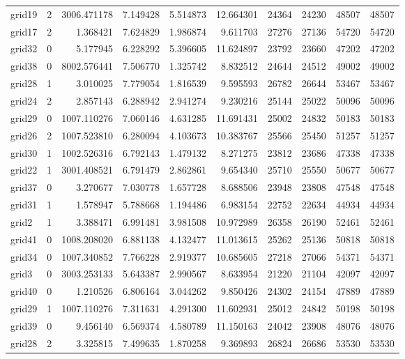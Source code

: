 \begin{longtable}{|l|r|r|r|r|r|r|r|r|r|}
grid19 & 2 & 3006.471178 & 7.149428 & 5.514873 & 12.664301 & 24364 & 24230 & 48507 & 48507 \\
grid17 & 2 & 1.368421 & 7.624829 & 1.986874 & 9.611703 & 27276 & 27136 & 54720 & 54720 \\
grid32 & 0 & 5.177945 & 6.228292 & 5.396605 & 11.624897 & 23792 & 23660 & 47202 & 47202 \\
grid38 & 0 & 8002.576441 & 7.506770 & 1.325742 & 8.832512 & 24644 & 24512 & 49002 & 49002 \\
grid28 & 1 & 3.010025 & 7.779054 & 1.816539 & 9.595593 & 26782 & 26644 & 53467 & 53467 \\
grid24 & 2 & 2.857143 & 6.288942 & 2.941274 & 9.230216 & 25144 & 25022 & 50096 & 50096 \\
grid29 & 0 & 1007.110276 & 7.060146 & 4.631285 & 11.691431 & 25002 & 24832 & 50183 & 50183 \\
grid26 & 2 & 1007.523810 & 6.280094 & 4.103673 & 10.383767 & 25566 & 25450 & 51257 & 51257 \\
grid30 & 1 & 1002.526316 & 6.792143 & 1.479132 & 8.271275 & 23812 & 23686 & 47338 & 47338 \\
grid22 & 1 & 3001.408521 & 6.791479 & 2.862861 & 9.654340 & 25710 & 25550 & 50677 & 50677 \\
grid37 & 0 & 3.270677 & 7.030778 & 1.657728 & 8.688506 & 23948 & 23808 & 47548 & 47548 \\
grid31 & 1 & 1.578947 & 5.788668 & 1.194486 & 6.983154 & 22752 & 22634 & 44934 & 44934 \\
grid2 & 1 & 3.388471 & 6.991481 & 3.981508 & 10.972989 & 26358 & 26190 & 52461 & 52461 \\
grid41 & 0 & 1008.208020 & 6.881138 & 4.132477 & 11.013615 & 25262 & 25136 & 50818 & 50818 \\
grid34 & 0 & 1007.340852 & 7.766228 & 2.919377 & 10.685605 & 27218 & 27066 & 54371 & 54371 \\
grid3 & 0 & 3003.253133 & 5.643387 & 2.990567 & 8.633954 & 21220 & 21104 & 42097 & 42097 \\
grid40 & 0 & 1.210526 & 6.806164 & 3.044262 & 9.850426 & 24302 & 24154 & 47889 & 47889 \\
grid29 & 1 & 1007.110276 & 7.311631 & 4.291300 & 11.602931 & 25012 & 24842 & 50198 & 50198 \\
grid39 & 0 & 9.456140 & 6.569374 & 4.580789 & 11.150163 & 24042 & 23908 & 48076 & 48076 \\
grid28 & 2 & 3.325815 & 7.499635 & 1.870258 & 9.369893 & 26824 & 26686 & 53530 & 53530 \\

\end{longtable}
